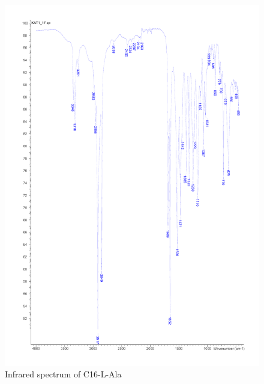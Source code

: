 \begin{figure}[ht!]
\centering
\includegraphics[scale=0.6]{IR/KAT1_17.pdf}
\caption{Infrared spectrum of C16-L-Ala}
\end{figure}

